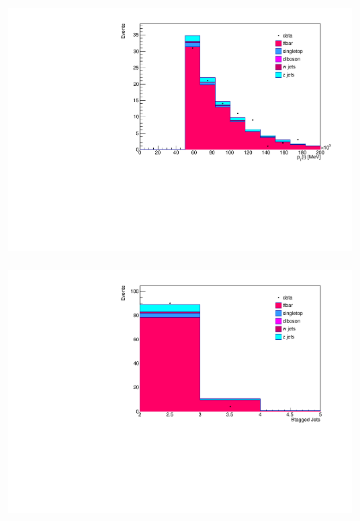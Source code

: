 \begin{figure}[H]
  \begin{subfigure}{0.5\textwidth}
    \centering
    \includegraphics[width=\linewidth]{plots_and_txt/stacked_plots/stacked_lep_pt.pdf}
    \caption{}
    \label{fig:stacked_lep_pt}
  \end{subfigure}%
  \begin{subfigure}{0.5\textwidth}
    \centering
    \includegraphics[width=\linewidth]{plots_and_txt/stacked_plots/stacked_btagged.pdf}
    \caption{}
    \label{fig:stacked_btagged}
  \end{subfigure}%
  \newline
  \begin{subfigure}{0.5\textwidth}
    \centering

\end{subfigure}
\end{figure}
